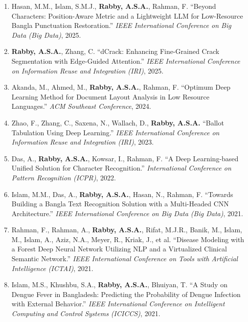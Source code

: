 \documentclass[11pt]{article}
\begin{document}
\renewcommand{\theenumi}{C\arabic{enumi}}
\begin{enumerate}
    \item Hasan, M.M., Islam, S.M.J., \textbf{Rabby, A.S.A.}, Rahman, F. ``Beyond Characters: Position-Aware Metric and a Lightweight LLM for Low-Resource Bangla Punctuation Restoration.'' \textit{IEEE International Conference on Big Data (Big Data)}, 2025.

    \item \textbf{Rabby, A.S.A.}, Zhang, C. ``dCrack: Enhancing Fine-Grained Crack Segmentation with Edge-Guided Attention.'' \textit{IEEE International Conference on Information Reuse and Integration (IRI)}, 2025.

    \item Akanda, M., Ahmed, M., \textbf{Rabby, A.S.A.}, Rahman, F. ``Optimum Deep Learning Method for Document Layout Analysis in Low Resource Languages.'' \textit{ACM Southeast Conference}, 2024.

    \item Zhao, F., Zhang, C., Saxena, N., Wallach, D., \textbf{Rabby, A.S.A.} ``Ballot Tabulation Using Deep Learning.'' \textit{IEEE International Conference on Information Reuse and Integration (IRI)}, 2023.

    \item Das, A., \textbf{Rabby, A.S.A.}, Kowsar, I., Rahman, F. ``A Deep Learning-based Unified Solution for Character Recognition.'' \textit{International Conference on Pattern Recognition (ICPR)}, 2022.

    \item Islam, M.M., Das, A., \textbf{Rabby, A.S.A.}, Hasan, N., Rahman, F. ``Towards Building a Bangla Text Recognition Solution with a Multi-Headed CNN Architecture.'' \textit{IEEE International Conference on Big Data (Big Data)}, 2021.
    
    \item Rahman, F., Rahman, A., \textbf{Rabby, A.S.A.}, Rifat, M.J.R., Banik, M., Islam, M., Islam, A., Aziz, N.A., Meyer, R., Kriak, J., et al. ``Disease Modeling with a Forest Deep Neural Network Utilizing NLP and a Virtualized Clinical Semantic Network.'' \textit{IEEE International Conference on Tools with Artificial Intelligence (ICTAI)}, 2021.
    
    \item Islam, M.S., Khushbu, S.A., \textbf{Rabby, A.S.A.}, Bhuiyan, T. ``A Study on Dengue Fever in Bangladesh: Predicting the Probability of Dengue Infection with External Behavior.'' \textit{IEEE International Conference on Intelligent Computing and Control Systems (ICICCS)}, 2021.
    

\end{enumerate}
\end{document}
